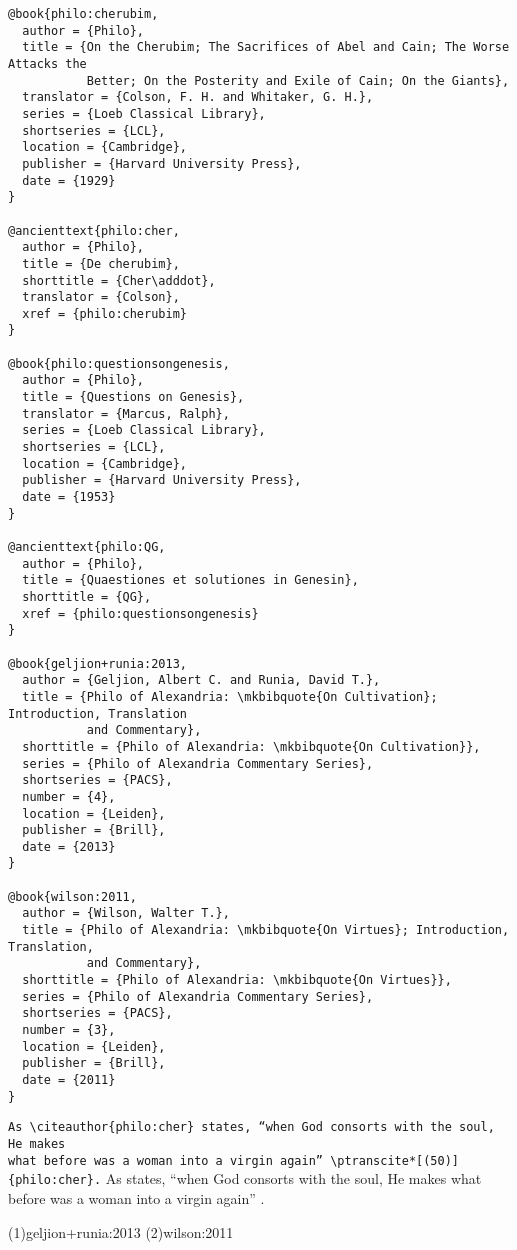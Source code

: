 \documentclass[a4paper]{article}
\begin{document}
\begin{verbatim}
@book{philo:cherubim,
  author = {Philo},
  title = {On the Cherubim; The Sacrifices of Abel and Cain; The Worse Attacks the
           Better; On the Posterity and Exile of Cain; On the Giants},
  translator = {Colson, F. H. and Whitaker, G. H.},
  series = {Loeb Classical Library},
  shortseries = {LCL},
  location = {Cambridge},
  publisher = {Harvard University Press},
  date = {1929}
}

@ancienttext{philo:cher,
  author = {Philo},
  title = {De cherubim},
  shorttitle = {Cher\adddot},
  translator = {Colson},
  xref = {philo:cherubim}
}

@book{philo:questionsongenesis,
  author = {Philo},
  title = {Questions on Genesis},
  translator = {Marcus, Ralph},
  series = {Loeb Classical Library},
  shortseries = {LCL},
  location = {Cambridge},
  publisher = {Harvard University Press},
  date = {1953}
}

@ancienttext{philo:QG,
  author = {Philo},
  title = {Quaestiones et solutiones in Genesin},
  shorttitle = {QG},
  xref = {philo:questionsongenesis}
}

@book{geljion+runia:2013,
  author = {Geljion, Albert C. and Runia, David T.},
  title = {Philo of Alexandria: \mkbibquote{On Cultivation}; Introduction, Translation
           and Commentary},
  shorttitle = {Philo of Alexandria: \mkbibquote{On Cultivation}},
  series = {Philo of Alexandria Commentary Series},
  shortseries = {PACS},
  number = {4},
  location = {Leiden},
  publisher = {Brill},
  date = {2013}
}

@book{wilson:2011,
  author = {Wilson, Walter T.},
  title = {Philo of Alexandria: \mkbibquote{On Virtues}; Introduction, Translation,
           and Commentary},
  shorttitle = {Philo of Alexandria: \mkbibquote{On Virtues}},
  series = {Philo of Alexandria Commentary Series},
  shortseries = {PACS},
  number = {3},
  location = {Leiden},
  publisher = {Brill},
  date = {2011}
}
\end{verbatim}


\verb|As \citeauthor{philo:cher} states, “when God consorts with the soul, He makes|\\
\verb|what before was a woman into a virgin again” \ptranscite*[(50)]{philo:cher}.|
\examplenobreak
As \citeauthor{philo:cher} states, “when God consorts with the soul, He makes
what before was a woman into a virgin again” .

\examplecite(1){geljion+runia:2013}
\examplecite(2){wilson:2011}
\exampleancientsources
\examplesecondarysources
\examplebibliography
{}
\end{document}
